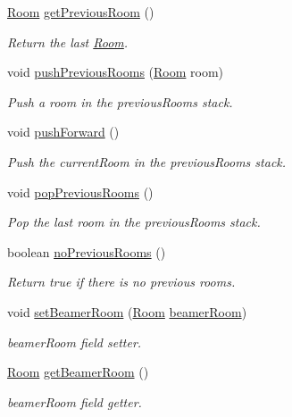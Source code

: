 \begin{DoxyCompactItemize}
\hyperlink{classpkg__world_1_1Room}{Room} \hyperlink{classpkg__world_1_1Player_adcff90c8c1b6fd5dcb3c4516d7e3a277}{get\-Previous\-Room} ()
\begin{DoxyCompactList}\small\item\em Return the last \hyperlink{classpkg__world_1_1Room}{Room}. \end{DoxyCompactList}\item 
void \hyperlink{classpkg__world_1_1Player_a6b419da985921727891cee03e4a7e755}{push\-Previous\-Rooms} (\hyperlink{classpkg__world_1_1Room}{Room} room)
\begin{DoxyCompactList}\small\item\em Push a room in the previous\-Rooms stack. \end{DoxyCompactList}\item 
void \hyperlink{classpkg__world_1_1Player_af97dc9ce2806115a09ab6a3ba08ed673}{push\-Forward} ()
\begin{DoxyCompactList}\small\item\em Push the current\-Room in the previous\-Rooms stack. \end{DoxyCompactList}\item 
void \hyperlink{classpkg__world_1_1Player_a4ef9377c34206c64ef1086de669ca5f1}{pop\-Previous\-Rooms} ()
\begin{DoxyCompactList}\small\item\em Pop the last room in the previous\-Rooms stack. \end{DoxyCompactList}\item 
boolean \hyperlink{classpkg__world_1_1Player_abe1633071742e8825d40317150f66835}{no\-Previous\-Rooms} ()
\begin{DoxyCompactList}\small\item\em Return true if there is no previous rooms. \end{DoxyCompactList}\item 
void \hyperlink{classpkg__world_1_1Player_a6dc6248fa7cbe281e9a7c5d6b86f242c}{set\-Beamer\-Room} (\hyperlink{classpkg__world_1_1Room}{Room} \hyperlink{classpkg__world_1_1Player_aadfcdea19eefea1137932f9329c08209}{beamer\-Room})
\begin{DoxyCompactList}\small\item\em beamer\-Room field setter. \end{DoxyCompactList}\item 
\hyperlink{classpkg__world_1_1Room}{Room} \hyperlink{classpkg__world_1_1Player_a81893b37cd26426863087f353f8be3ab}{get\-Beamer\-Room} ()
\begin{DoxyCompactList}\small\item\em beamer\-Room field getter. \end{DoxyCompactList}\item 

\end{DoxyCompactItemize}
